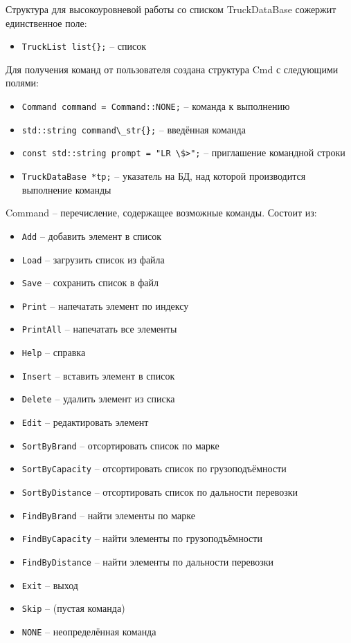 Структура для высокоуровневой работы со списком TruckDataBase сожержит единственное поле:

\begin{itemize}
    \item \verb|TruckList list{};| -- список
\end{itemize}

Для получения команд от пользователя создана структура Cmd с следующими полями:

\begin{itemize}
    \item \verb|Command command = Command::NONE;| -- команда к выполнению
    \item \verb|std::string command\_str{};| -- введённая команда
    \item \verb|const std::string prompt = "LR \$>";| -- приглашение командной строки
    \item \verb|TruckDataBase *tp;| -- указатель на БД, над которой производится выполнение команды
\end{itemize}

Command -- перечисление, содержащее возможные команды.
Состоит из:

\begin{itemize}
    \item \verb|Add| -- добавить элемент в список
    \item \verb|Load| -- загрузить список из файла
    \item \verb|Save| -- сохранить список в файл
    \item \verb|Print| -- напечатать элемент по индексу
    \item \verb|PrintAll| -- напечатать все элементы
    \item \verb|Help| -- справка
    \item \verb|Insert| -- вставить элемент в список
    \item \verb|Delete| -- удалить элемент из списка
    \item \verb|Edit| -- редактировать элемент
    \item \verb|SortByBrand| -- отсортировать список по марке
    \item \verb|SortByCapacity| -- отсортировать список по грузоподъёмности
    \item \verb|SortByDistance| -- отсортировать список по дальности перевозки
    \item \verb|FindByBrand| -- найти элементы по марке
    \item \verb|FindByCapacity| -- найти элементы по грузоподъёмности
    \item \verb|FindByDistance| -- найти элементы по дальности перевозки
    \item \verb|Exit| -- выход
    \item \verb|Skip| -- (пустая команда)
    \item \verb|NONE| -- неопределённая команда
\end{itemize}

